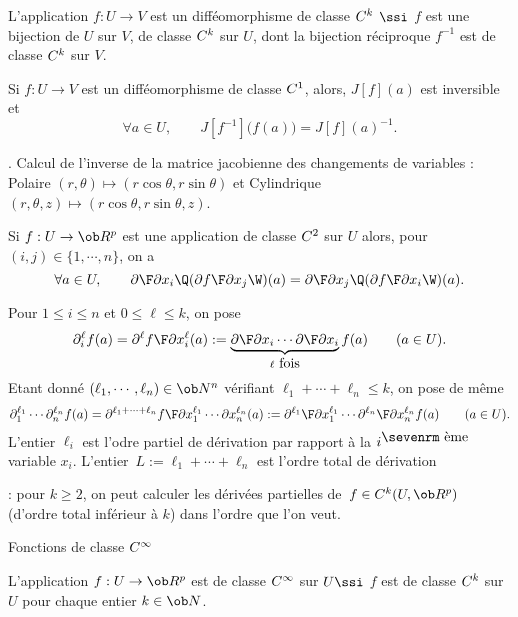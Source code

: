 L'application $f:U\to V$ est un diff\'eomorphisme de classe $\sc C^k$ $\ssi$ $f$ est une bijection de $U$ sur $V$, 
de classe $\sc C^k$ sur $U$, 
dont la bijection r\'eciproque $f^{-1}$ est de classe $\sc C^k$ sur $V$. 


\Propriete [$U$ et $V$ ouverts de $\ob R^n$]
Si $f:U\to V$ est un diff\'eomorphisme de classe $\sc C^1$, alors, $J[f](a)$ est inversible et 
$$
\forall a\in U, \qquad J[f^{-1}]\big(f(a)\big)=J[f](a)^{-1}.
$$ 

\Exemple. Calcul de l'inverse de la matrice jacobienne des changements de variables : 
Polaire $(r,\theta)\mapsto(r\cos\theta,r\sin\theta)$ et Cylindrique $(r,\theta,z)\mapsto(r\cos\theta,r\sin\theta,z)$.  
\bigskip


\Theoreme [$U$ ouvert de $\ob R^n$] Si $f:U\to\ob R^p$ est une application de classe $\sc C^2$ sur $U$ 
alors, pour $(i,j)\in\{1,\cdots ,n\}$, on a 
$$
\forall a\in U,\qquad {\partial\F\partial x_i}\Q({\partial f\F\partial x_j}\W)(a)={\partial\F\partial x_j}\Q({\partial f\F\partial x_i}\W)(a). 
$$
\smallskip


Pour $1\le i\le n$ et $0\le\ell\le k$, on pose 
$$
\partial_i^\ell f(a)={\partial^\ell f\F\partial x_i^\ell}(a)
:=\underbrace{{\partial\F\partial x_i}\cdots{\partial\F\partial x_i}}_{\ell\mbox{ fois}}f(a)\qquad(a\in U). 
$$
Etant donn\'e $(\ell_1,\cdots,\ell_n)\in\ob N^n$ 
v\'erifiant $\ell_1+\cdots+\ell_n\le k$, on pose de m\^eme 
$$
\partial_1^{\ell_1}\cdots\partial_n^{\ell_n}f(a)={\partial^{\ell_1+\cdots+\ell_n}f\F\partial x_1^{\ell_1}\cdots\partial x_n^{\ell_n}}(a):=
{\partial^{\ell_1}\F\partial x_1^{\ell_1}}\cdots{\partial^{\ell_n}\F\partial x_n^{\ell_n}}f(a)\qquad(a\in U). 
$$
L'entier $\ell_i$ est l'odre partiel de d\'erivation par rapport \`a 
la $i^{\mbox{\sevenrm \`eme}}$ variable $x_i$. \pn
L'entier~$L:=\ell_1+\cdots+\ell_n$ est l'ordre total de d\'erivation 

\Remarque : pour $k\ge2$, on peut calculer 
les d\'eriv\'ees partielles de~$f\in\sc C^k(U,\ob R^p)$ (d'ordre total inf\'erieur \`a $k$) 
 dans l'ordre que l'on veut. 
\bigskip

\Concept [] Fonctions de classe $\sc C^\infty$

\Definition [$U$ ouvert de $\ob R^n$] 
L'application $f:U\to\ob R^p$ est de classe $\sc C^\infty$ 
sur $U\ssi$ $f$ est de classe $\sc C^k$ sur $U$ 
pour chaque entier $k\in\ob N$. 

